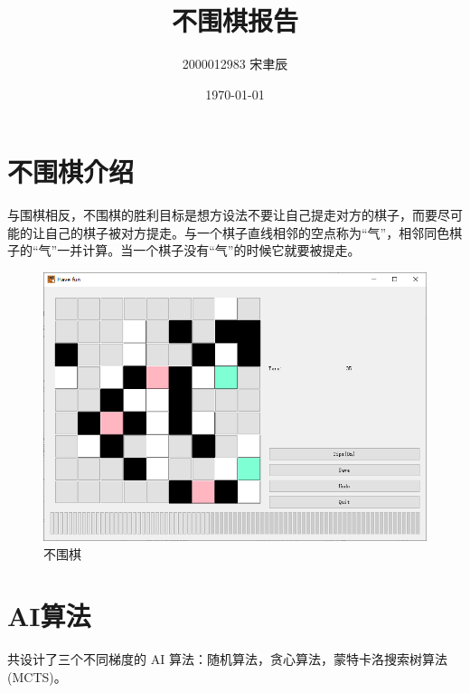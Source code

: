 \documentclass[UTF-8]{ctexart}
\title{不围棋报告}
\author{2000012983 宋聿辰}
\date{\today}
\affil{北京大学信息科学技术学院}
\begin{document}
	\maketitle%
	\begin{abstract}
	\end{abstract}
	\newpage
	\tableofcontents%
	\newpage%
	\section{不围棋介绍}
		与围棋相反，不围棋的胜利目标是想方设法不要让自己提走对方的棋子，而要尽可能的让自己的棋子被对方提走。与一个棋子直线相邻的空点称为“气”，相邻同色棋子的“气”一并计算。当一个棋子没有“气”的时候它就要被提走。
		\begin{figure}[H]
			\centering
			\includegraphics[width=15cm]{./file/main.png}
			\caption{不围棋}
		\end{figure}
	\section{AI算法}
		共设计了三个不同梯度的 AI 算法：随机算法，贪心算法，蒙特卡洛搜索树算法(MCTS)。
\end{document}
